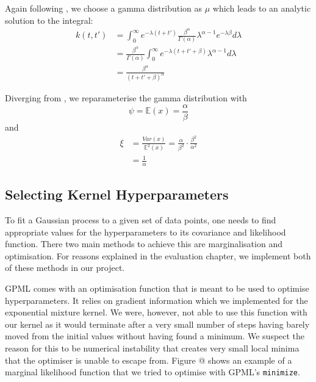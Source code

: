\documentclass[a4paper,12pt,twoside,openright]{report}
\begin{document}
Again following \cite{2014arXiv1406.3896S}, we choose a gamma distribution as $\mu$ which leads to an analytic solution to the integral:
\begin{align}
k(t, t') &= \int_0^{\infty} e^{-\lambda(t+t')}\frac{\beta^\alpha}{\Gamma(\alpha)}\lambda^{\alpha -1}e^{-\lambda\beta} d\lambda\\
&=\frac{\beta^\alpha}{\Gamma(\alpha)}\int_0^\infty e^{-\lambda(t+t'+\beta)}\lambda^{\alpha-1}d\lambda\\
&=\frac{\beta^\alpha}{(t+t'+\beta)^\alpha}
\end{align}

Diverging from \cite{2014arXiv1406.3896S}, we reparameterise the gamma distribution with
\begin{equation}
\psi = \mathbb{E}(x) = \frac{\alpha}{\beta}
\end{equation}
and
\begin{align}
\xi &= \frac{Var(x)}{\mathbb{E}^2 (x)} = \frac{\alpha}{\beta^2} \cdot \frac{\beta^2}{\alpha^2}\\
&= \frac{1}{\alpha}
\end{align}



\subsection{Selecting Kernel Hyperparameters} 

To fit a Gaussian process to a given set of data points, one needs to find appropriate values for the hyperparameters to its covariance and likelihood function. There two main methods to achieve this are marginalisation and optimisation. For reasons explained in the evaluation chapter, we implement both of these methods in our project.

GPML comes with an optimisation function that is meant to be used to optimise hyperparameters. It relies on gradient information which we implemented for the exponential mixture kernel. We were, however, not able to use this function with our kernel as it would terminate after a very small number of steps having barely moved from the initial values without having found a minimum. We suspect the reason for this to be numerical instability that creates very small local minima that the optimiser is unable to escape from. Figure @ shows an example of a marginal likelihood function that we tried to optimise with GPML's \texttt{minimize}.
\end{document}
